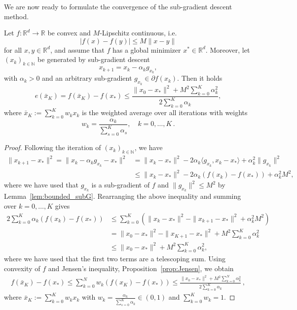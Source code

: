 \documentclass[12pt,openany]{book}
\theoremstyle{definition}
\theoremstyle{definition}
\newcommand{\N}{\mathbb{N}}
\newcommand{\R}{\mathbb{R}}
\begin{document}
We are now ready to formulate the convergence of the sub-gradient descent method. 
\begin{thm}\label{thm:subGD}
Let $f:\R^d\to\R$ be convex and $M$-Lipschitz continuous, i.e.~~
\[|f(x)-f(y)|\le M\|x-y\| \]
for all $x,y\in\R^d$, and assume that $f$ has a global minimizer $x^\ast\in\R^d$.  Moreover, let $(x_k)_{k\in\N}$ be generated by sub-gradient descent
\[x_{k+1} = x_k - \alpha_k g_{x_k}, \]
with $\alpha_k>0$ and an arbitrary sub-gradient $g_{x_k}\in\partial f(x_k)$. Then it holds
\[e(\bar x_K) = f(\bar x_K)-f(x_\ast)\le \frac{\|x_0-x_\ast\|^2+M^2 \sum_{k=0}^K\alpha_k^2}{2\sum_{k=0}^K\alpha_k}, \]
where $\bar x_K:=\sum_{k=0}^K w_k x_k$ is the weighted average over all iterations with weights \[w_k = \frac{\alpha_k}{\sum_{s=0}^K\alpha_s},\quad  k=0,\dots,K\,.\]
\end{thm}
\begin{proof}
Following the iteration of $(x_k)_{k\in\N}$, we have
\begin{align*}
\|x_{k+1}-x_\ast\|^2 = \|x_k-\alpha_kg_{x_k}-x_\ast\|^2 &= \|x_k-x_\ast\|^2 -2\alpha_k\langle g_{x_k},x_k-x_\ast\rangle + \alpha_k^2 \|g_{x_k}\|^2\\
&\le  \|x_k-x_\ast\|^2 - 2\alpha_k (f(x_k)-f(x_\ast)) + \alpha_k^2 M^2,
\end{align*}
where we have used that $g_{x_k}$ is a sub-gradient of $f$ and $\|g_{x_k}\|^2\le M^2$ by Lemma~\ref{lem:bounded_subG}. Rearranging the above inequality and summing over $k=0,\dots,K$ gives
\begin{align*}
2\sum_{k=0}^K\alpha_k (f(x_k)-f(x_\ast)) &\le \sum_{k=0}^K \left(\|x_k-x_\ast\|^2-\|x_{k+1}-x_\ast\|^2 + \alpha_k^2 M^2\right)\\ 
&= \|x_0-x_\ast\|^2 - \|x_{K+1}-x_\ast\|^2 + M^2\sum_{k=0}^K \alpha_k^2\\
&\le \|x_0-x_\ast\|^2+ M^2\sum_{k=0}^K \alpha_k^2,
\end{align*}
where we have used that the first two terms are a telescoping sum. Using convexity of $f$ and Jensen's inequality, Proposition~\ref{prop:Jensen}, we obtain
\begin{align*}
f(\bar x_K)-f(x_\ast) \le \sum_{k=0}^N w_k \left(f(x_K)-f(x_\ast)\right)\le \frac{\|x_0-x_\ast\|^2 + M^2\sum_{k=0}^N \alpha_k^2 }{2\sum_{k=0}^K\alpha_k}\,,
\end{align*}
where $\bar x_K:=\sum_{k=0}^K w_k x_k$ with $w_k=\frac{\alpha_k}{\sum_{s=0}^K\alpha_k}\in(0,1)$ and $\sum_{k=0}^K w_k=1$.
\end{proof}
\end{document}
